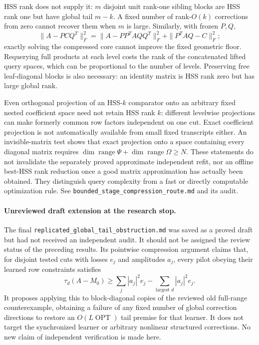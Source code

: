 \documentclass[11pt,oneside,openany,a4paper]{report}
\numberwithin{equation}{chapter}
\theoremstyle{definition}
\theoremstyle{remark}
\newcommand{\sourcefile}[1]{{\small\nolinkurl{#1}}}
\begin{document}
HSS rank does not supply it: $m$ disjoint unit rank-one sibling blocks
are HSS rank one but have global tail $m-k$.  A fixed number of
rank-$O(k)$ corrections from zero cannot recover them when $m$ is
large.  Similarly, with frozen $P,Q$,
\[
 \|A-PCQ^T\|_F^2
 =\|A-PP^TAQQ^T\|_F^2+\|P^TAQ-C\|_F^2;
\]
exactly solving the compressed core cannot improve the fixed geometric
floor.  Requerying full products at each level costs the rank of the
concatenated lifted query spaces, which can be proportional to the
number of levels.  Preserving free leaf-diagonal blocks is also
necessary: an identity matrix is HSS rank zero but has large global
rank.

Even orthogonal projection of an HSS-$k$ comparator onto an arbitrary
fixed nested coefficient space need not retain HSS rank $k$: different
levelwise projections can make formerly common row factors independent
on one cut.  Exact coefficient projection is not automatically
available from small fixed transcripts either.  An invisible-matrix
test shows that exact projection onto a space containing every
diagonal matrix requires
$\dim\operatorname{range}\Psi+\dim\operatorname{range}\Omega\ge N$.
These statements do not invalidate the separately proved approximate
independent refit, nor an offline best-HSS rank reduction once a good
matrix approximation has actually been obtained.  They distinguish
query complexity from a fast or directly computable optimization rule.
See \sourcefile{bounded_stage_compression_route.md} and its audit.

\paragraph{Unreviewed draft extension at the research stop.}
The final \sourcefile{replicated_global_tail_obstruction.md} was saved
as a proved draft but had not received an independent audit.  It
should not be assigned the review status of the preceding results.
Its pointwise compression argument claims that, for disjoint tested
cuts with losses $e_j$ and amplitudes $a_j$, every pilot obeying their
learned row constraints satisfies
\[
 \tau_d(A-M_0)\ge
 \sum_j|a_j|^2e_j-\sum_{\text{largest }d}|a_j|^2e_j.
\]
It proposes applying this to block-diagonal copies of the reviewed old
full-range counterexample, obtaining a failure of any fixed number of
global correction directions to restore an $O(L\operatorname{OPT})$
tail premise for that learner.  It does not target the synchronized
learner or arbitrary nonlinear structured corrections.  No new claim
of independent verification is made here.
\end{document}
